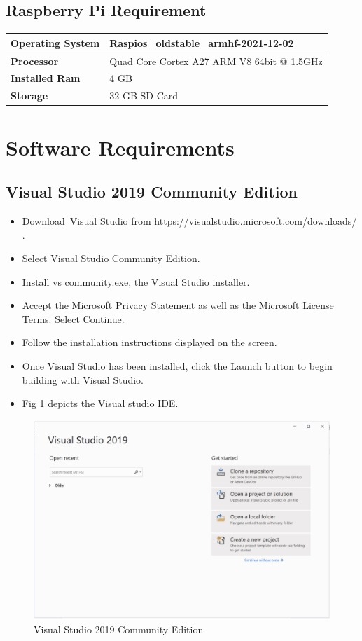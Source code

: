 \documentclass[10pt]{article}
\begin{document}
\subsection{Raspberry Pi Requirement}

\begin{table}[]
\begin{tabular}{|l|l|}
\hline
\textbf{Operating System} & Raspios\_oldstable\_armhf-2021-12-02 \\ \hline
\textbf{Processor} & Quad Core Cortex A27 ARM V8 64bit @ 1.5GHz \\ \hline
\textbf{Installed Ram} & 4 GB \\ \hline
\textbf{Storage} & 32 GB SD Card \\ \hline
\end{tabular}
\end{table}

\section{Software Requirements}
\subsection{Visual Studio 2019 Community Edition}
\begin{itemize}
    \item Download Visual Studio from https://visualstudio.microsoft.com/downloads/ \cite{2}.
\item Select Visual Studio Community Edition.
\item Install vs community.exe, the Visual Studio installer.
\item Accept the Microsoft Privacy Statement as well as the Microsoft License Terms. Select Continue.
\item Follow the installation instructions displayed on the screen.
\item Once Visual Studio has been installed, click the Launch button to begin building with Visual Studio.
\item Fig \ref{fig:vs} depicts the Visual studio IDE.
\end{itemize}
\begin{figure}[H]
    \begin{center}
        \includegraphics[width=0.7\linewidth, frame]{CA2-template/CM4.png}
       \caption{Visual Studio 2019 Community Edition \label{fig:vs}}
    \end{center}
\end{figure}
\end{document}

